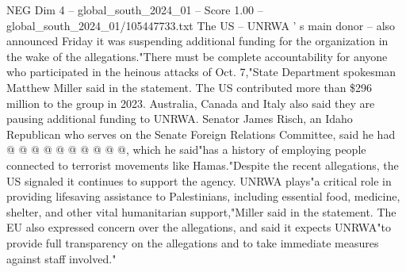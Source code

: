 \begin{textsample}{NEG Dim 4 – global\_south\_2024\_01 – Score 1.00 – global\_south\_2024\_01/105447733.txt}
The US -- UNRWA ' s main donor -- also announced Friday it was suspending additional funding for the organization in the wake of the allegations."There must be complete accountability for anyone who participated in the heinous attacks of Oct. 7,"State Department spokesman Matthew Miller said in the statement.
The US contributed more than \$296 million to the group in 2023.
Australia, Canada and Italy also said they are pausing additional funding to UNRWA.
Senator James Risch, an Idaho Republican who serves on the Senate Foreign Relations Committee, said he had @ @ @ @ @ @ @ @ @ @, which he said"has a history of employing people connected to terrorist movements like Hamas."Despite the recent allegations, the US signaled it continues to support the agency.
UNRWA plays"a critical role in providing lifesaving assistance to Palestinians, including essential food, medicine, shelter, and other vital humanitarian support,"Miller said in the statement.
The EU also expressed concern over the allegations, and said it expects UNRWA"to provide full transparency on the allegations and to take immediate measures against staff involved."

\end{textsample}
